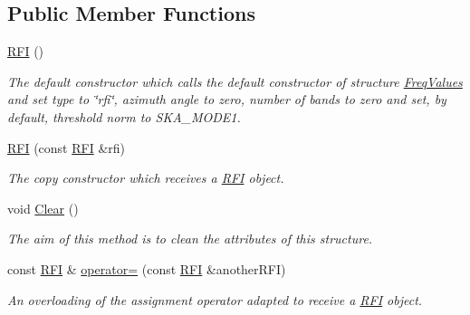 \subsection*{Public Member Functions}
\begin{DoxyCompactItemize}
\item 
\mbox{\label{structRFI_ad0183cf1bc28c3f907e16428a5816e35}} 
\hyperlink{structRFI_ad0183cf1bc28c3f907e16428a5816e35}{R\+FI} ()
\begin{DoxyCompactList}\small\item\em The default constructor which calls the default constructor of structure {\itshape \hyperlink{structFreqValues}{Freq\+Values}} and set type to \char`\"{}rfi\char`\"{}, azimuth angle to zero, number of bands to zero and set, by default, threshold norm to S\+K\+A\+\_\+\+M\+O\+D\+E1. \end{DoxyCompactList}\item 
\hyperlink{structRFI_a82852dbeab11484c90d4b339f63aefa9}{R\+FI} (const \hyperlink{structRFI}{R\+FI} \&rfi)
\begin{DoxyCompactList}\small\item\em The copy constructor which receives a {\itshape \hyperlink{structRFI}{R\+FI}} object. \end{DoxyCompactList}\item 
\mbox{\label{structRFI_a103d0419053a7e323647cdafb3b036e3}} 
void \hyperlink{structRFI_a103d0419053a7e323647cdafb3b036e3}{Clear} ()
\begin{DoxyCompactList}\small\item\em The aim of this method is to clean the attributes of this structure. \end{DoxyCompactList}\item 
const \hyperlink{structRFI}{R\+FI} \& \hyperlink{structRFI_a8fcc866a09f2f88a9754e04a1d056104}{operator=} (const \hyperlink{structRFI}{R\+FI} \&another\+R\+FI)
\begin{DoxyCompactList}\small\item\em An overloading of the assignment operator adapted to receive a {\itshape \hyperlink{structRFI}{R\+FI}} object. \end{DoxyCompactList}\end{DoxyCompactItemize}
